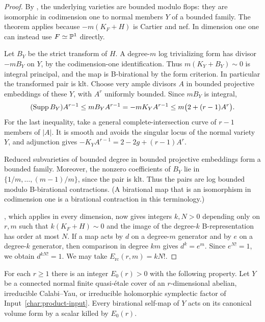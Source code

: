 \begin{proof}
By \citet[Theorem~1.2]{HanJiang}, the underlying varieties are
bounded modulo flops: they are isomorphic in codimension one to
normal members $Y$ of a bounded family.  The theorem applies because
$-m(K_F+H)$ is Cartier and nef.  In dimension one one can instead
use $F\simeq\mathbb P^1$ directly.

Let $B_Y$ be the strict transform of $H$.  A degree-$m$ log
trivializing form has divisor $-mB_Y$ on $Y$, by the codimension-one
identification.  Thus $m(K_Y+B_Y)\sim0$ is integral principal, and
the map is B-birational by the form criterion.  In particular the
transformed pair is klt.  Choose very ample divisors $A$ in bounded
projective embeddings of these $Y$, with $A^r$ uniformly bounded.
Since $mB_Y$ is integral,
\begin{equation}\label{char:boundary-degree}
 (\operatorname{Supp} B_Y)A^{r-1}
 \leq mB_YA^{r-1}=-mK_YA^{r-1}
 \leq m\bigl(2+(r-1)A^r\bigr).
\end{equation}
For the last inequality, take a general complete-intersection curve
of $r-1$ members of $|A|$.  It is smooth and avoids the singular
locus of the normal variety $Y$, and adjunction gives
$-K_YA^{r-1}=2-2g+(r-1)A^r$.

Reduced subvarieties of bounded degree in bounded projective
embeddings form a bounded family.  Moreover, the nonzero
coefficients of $B_Y$ lie in
$\{1/m,\ldots,(m-1)/m\}$, since the pair is klt.  Thus the pairs
are log bounded modulo B-birational contractions.  (A birational
map that is an isomorphism in codimension one is a birational
contraction in this terminology.)

\citet[Theorem~3.2]{JiangLiu}, which applies in every dimension,
now gives integers $k,N>0$ depending only on $r,m$ such that
$k(K_F+H)\sim0$ and the image of the degree-$k$ B-representation
has order at most $N$.  If a map acts by $d$ on a degree-$m$
generator and by $e$ on a degree-$k$ generator, then comparison in
degree $km$ gives $d^k=e^m$.  Since $e^{N!}=1$, we obtain
$d^{kN!}=1$.  We may take $E_{\mathrm{rc}}(r,m)=kN!$.
\end{proof}

\begin{lemma}\label{char:hodge-bound}
For each $r\geq1$ there is an integer $E_0(r)>0$ with the following
property.  Let $Y$ be a connected normal finite quasi-\'etale cover
of an $r$-dimensional abelian, irreducible Calabi--Yau, or irreducible
holomorphic symplectic factor of Input~\ref{char:product-input}.
Every birational self-map of $Y$ acts on its canonical volume form
by a scalar killed by $E_0(r)$.
\end{lemma}


